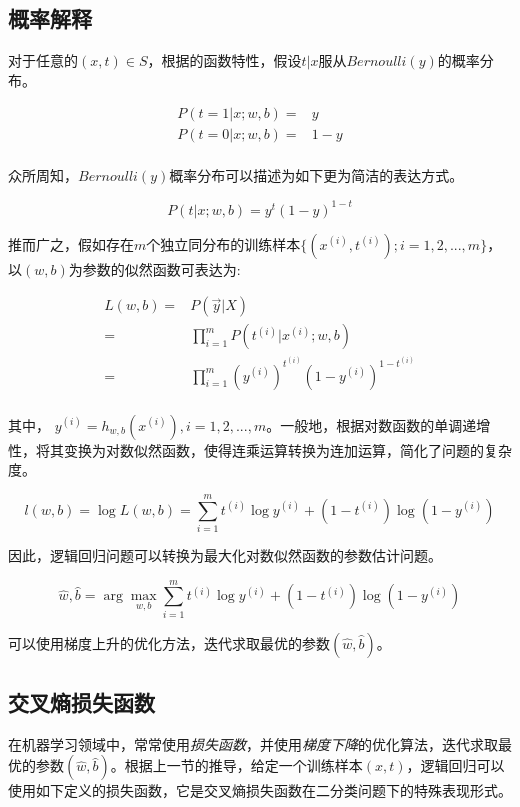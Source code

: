 \begin{content}
\subsection{概率解释}

对于任意的$(x,t) \in S$，根据的函数特性，假设$t|x$服从$Bernoulli(y)$的概率分布。

\[\begin{aligned}
  P(t = 1|x;w,b) = & y \\ 
  P(t = 0|x;w,b) = & 1 - y \\ 
\end{aligned} \]

众所周知，$Bernoulli(y)$概率分布可以描述为如下更为简洁的表达方式。

\[P(t|x;w,b) = {y^t}{(1 - y)^{1 - t}}\]

推而广之，假如存在$m$个独立同分布的训练样本$\{ ({x^{(i)}},{t^{(i)}});i = 1,2,...,m\}$，以$(w,b)$为参数的似然函数可表达为:

\[\begin{aligned}
  L(w,b) =  & P\left( {\vec y|X} \right) \\ 
   =  & \prod\limits_{i = 1}^m {P\left( {{t^{(i)}}|{x^{(i)}};w,b} \right)}  \\ 
   =  & \prod\limits_{i = 1}^m {{{\left( {{y^{(i)}}} \right)}^{{t^{(i)}}}}{{\left( {1 - {y^{(i)}}} \right)}^{1 - {t^{(i)}}}}}  \\ 
\end{aligned} \]

其中，
${y^{(i)}} = {h_{w,b}}({x^{(i)}}), i=1,2,...,m $。一般地，根据对数函数的单调递增性，将其变换为对数似然函数，使得连乘运算转换为连加运算，简化了问题的复杂度。

\[l(w,b) = \log L(w,b) = \sum\limits_{i = 1}^m {{t^{(i)}}\log {y^{(i)}} + \left( {1 - {t^{(i)}}} \right)\log \left( {1 - {y^{(i)}}} \right)} \]

因此，逻辑回归问题可以转换为最大化对数似然函数的参数估计问题。

\[\hat w,\hat b = \arg \mathop {\max }\limits_{w,b} \sum\limits_{i = 1}^m {{t^{(i)}}\log {y^{(i)}} + \left( {1 - {t^{(i)}}} \right)\log \left( {1 - {y^{(i)}}} \right)} \]

可以使用梯度上升的优化方法，迭代求取最优的参数$(\hat w,\hat b)$。

\subsection{交叉熵损失函数}

在机器学习领域中，常常使用\emph{损失函数}，并使用\emph{梯度下降}的优化算法，迭代求取最优的参数$(\hat w,\hat b)$。根据上一节的推导，给定一个训练样本$(x, t)$，逻辑回归可以使用如下定义的损失函数，它是交叉熵损失函数在二分类问题下的特殊表现形式。


\end{content}
